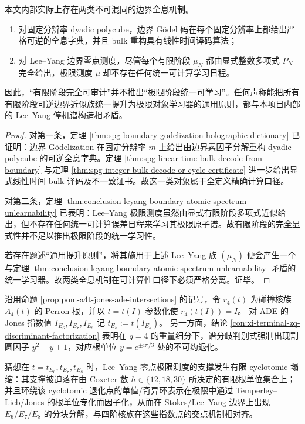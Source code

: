 \begin{theorem}[有限阶段精确全息与极限阶段统一学习的可计算性分裂]\label{thm:conclusion-finitestage-exact-holography-limit-learning-split}
本文内部实际上存在两类不可混同的边界全息机制。
\begin{enumerate}
  \item 对固定分辨率 dyadic polycube，边界 Gödel 码在每个固定分辨率上都给出严格可逆的全息字典，并且 bulk 重构具有线性时间译码算法；
  \item 对 Lee--Yang 边界零点测度，尽管每个有限阶段 \(\mu_N\) 都由显式整数多项式 \(P_N\) 完全给出，极限测度 \(\mu\) 却不存在任何统一可计算学习日程。
\end{enumerate}
因此，“有限阶段完全可审计”并不推出“极限阶段统一可学习”。任何声称能把所有有限阶段可逆边界近似族统一提升为极限对象学习器的通用原则，都与本项目内部的 Lee--Yang 停机谱构造相矛盾。
\end{theorem}
\begin{proof}
对第一条，定理 \ref{thm:spg-boundary-godelization-holographic-dictionary} 已证明：边界 Gödelization 在固定分辨率 \(m\) 上给出由边界素因子分解重构 dyadic polycube 的可逆全息字典。定理 \ref{thm:spg-linear-time-bulk-decode-from-boundary} 与定理 \ref{thm:spg-integer-bulk-decode-or-cycle-certificate} 进一步给出显式线性时间 bulk 译码及不一致证书。故这一类对象属于全定义精确计算口径。

对第二条，定理 \ref{thm:conclusion-leyang-boundary-atomic-spectrum-unlearnability} 已表明：Lee--Yang 极限测度虽然由显式有限阶段多项式近似给出，但不存在任何统一可计算误差日程来学习其极限原子谱。故有限阶段的完全显式性并不足以推出极限阶段的统一学习性。

若存在题述“通用提升原则”，将其施用于上述 Lee--Yang 族 \((\mu_N)\) 便会产生一个与定理 \ref{thm:conclusion-leyang-boundary-atomic-spectrum-unlearnability} 矛盾的统一学习器。故两类全息机制在可计算性口径下必须严格分离。证毕。
\end{proof}

\begin{conjecture}\label{conj:conclusion-ade-jones-leyang-cyclotomic-collapse}
沿用命题 \ref{prop:pom-a4t-jones-ade-intersections} 的记号，令 \(r_4(t)\) 为碰撞核族 \(A_4(t)\) 的 Perron 根，并以 \(t=t(I)\) 参数化使 \(r_4(t(I))=I\)。
对 ADE 的 Jones 指数值 \(I_{E_6},I_{E_7},I_{E_8}\) 记 \(t_{E_k}:=t(I_{E_k})\)。
另一方面，结论 \ref{con:xi-terminal-zq-discriminant-factorization} 表明在 \(q=4\) 的重量细分下，谱分歧判别式强制出现割圆因子 \(y^2-y+1\)，对应根单位 \(y=e^{\pm i\pi/3}\) 处的不可约退化。
\par
猜想在 \(t=t_{E_6},t_{E_7},t_{E_8}\) 时，Lee--Yang 零点极限测度的支撑发生有限 cyclotomic 塌缩：其支撑被迫落在由 Coxeter 数 \(h\in\{12,18,30\}\) 所决定的有限根单位集合上；并且环绕该 cyclotomic 退化点的单值/奇异环表示在极限中通过 Temperley--Lieb/Jones 的根单位专化而因子化，从而在 Stokes/Lee--Yang 边界上出现 \(E_6/E_7/E_8\) 的分块分解，与四阶核族在这些指数点的交点机制相对齐。
\end{conjecture}

\endinput
